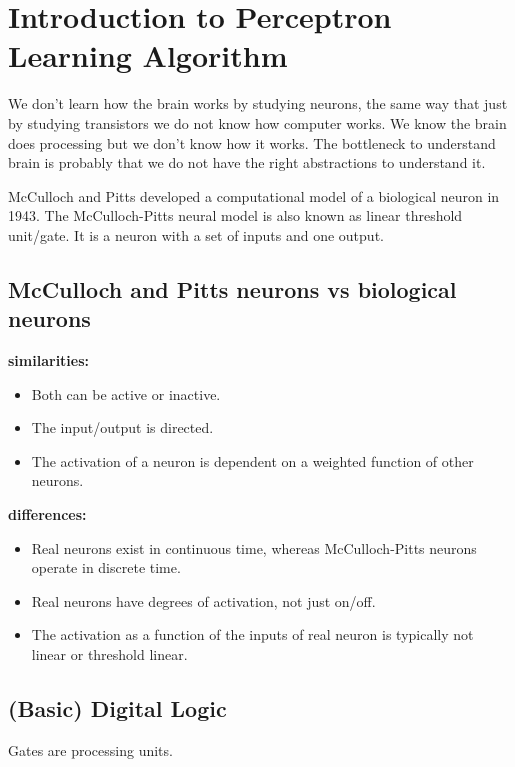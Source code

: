 \documentclass[main]{subfiles}
\begin{document}

\section{Introduction to Perceptron Learning Algorithm}

We don't learn how the brain works by studying neurons, the same way that just by studying transistors we do not know how computer works.
We know the brain does processing but we don't know how it works.
The bottleneck to understand brain is probably that we do not have the right abstractions to understand it.

McCulloch and Pitts developed a computational model of a biological neuron in 1943.
The McCulloch-Pitts neural model is also known as linear threshold unit/gate. It is a neuron with a set of inputs and one output.

\subsection{McCulloch and Pitts neurons vs biological neurons}
\textbf{similarities:}
\begin{itemize}[noitemsep,nolistsep]
	\item Both can be active or inactive.
	\item The input/output is directed.
	\item The activation of a neuron is dependent on a weighted function of other neurons.
\end{itemize}
\textbf{differences:}
\begin{itemize}[noitemsep,nolistsep]
	\item Real neurons exist in continuous time, whereas McCulloch-Pitts neurons operate in discrete time.
	\item Real neurons have degrees of activation, not just on/off.
	\item The activation as a function of the inputs of real neuron is typically not linear or threshold linear.
\end{itemize}

\subsection{(Basic) Digital Logic}

Gates are processing units.
\end{document}
